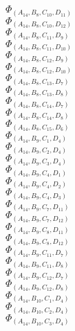 \documentclass[14pt]{article}
\begin{document}
    $\Phi_{({A}_{14}, {B}_{8}, {C}_{10}, {D}_{11})}$ \\ 
    $\Phi_{({A}_{14}, {B}_{8}, {C}_{10}, {D}_{12})}$ \\ 
    $\Phi_{({A}_{14}, {B}_{8}, {C}_{11}, {D}_{9})}$ \\ 
    $\Phi_{({A}_{14}, {B}_{8}, {C}_{11}, {D}_{10})}$ \\ 
    $\Phi_{({A}_{14}, {B}_{8}, {C}_{12}, {D}_{9})}$ \\ 
    $\Phi_{({A}_{14}, {B}_{8}, {C}_{12}, {D}_{10})}$ \\ 
    $\Phi_{({A}_{14}, {B}_{8}, {C}_{13}, {D}_{7})}$ \\ 
    $\Phi_{({A}_{14}, {B}_{8}, {C}_{13}, {D}_{8})}$ \\ 
    $\Phi_{({A}_{14}, {B}_{8}, {C}_{14}, {D}_{7})}$ \\ 
    $\Phi_{({A}_{14}, {B}_{8}, {C}_{14}, {D}_{8})}$ \\ 
    $\Phi_{({A}_{14}, {B}_{8}, {C}_{15}, {D}_{6})}$ \\ 
    $\Phi_{({A}_{14}, {B}_{9}, {C}_{1}, {D}_{4})}$ \\ 
    $\Phi_{({A}_{14}, {B}_{9}, {C}_{2}, {D}_{4})}$ \\ 
    $\Phi_{({A}_{14}, {B}_{9}, {C}_{3}, {D}_{4})}$ \\ 
    $\Phi_{({A}_{14}, {B}_{9}, {C}_{4}, {D}_{1})}$ \\ 
    $\Phi_{({A}_{14}, {B}_{9}, {C}_{4}, {D}_{2})}$ \\ 
    $\Phi_{({A}_{14}, {B}_{9}, {C}_{4}, {D}_{3})}$ \\ 
    $\Phi_{({A}_{14}, {B}_{9}, {C}_{7}, {D}_{11})}$ \\ 
    $\Phi_{({A}_{14}, {B}_{9}, {C}_{7}, {D}_{12})}$ \\ 
    $\Phi_{({A}_{14}, {B}_{9}, {C}_{8}, {D}_{11})}$ \\ 
    $\Phi_{({A}_{14}, {B}_{9}, {C}_{8}, {D}_{12})}$ \\ 
    $\Phi_{({A}_{14}, {B}_{9}, {C}_{11}, {D}_{7})}$ \\ 
    $\Phi_{({A}_{14}, {B}_{9}, {C}_{11}, {D}_{8})}$ \\ 
    $\Phi_{({A}_{14}, {B}_{9}, {C}_{12}, {D}_{7})}$ \\ 
    $\Phi_{({A}_{14}, {B}_{9}, {C}_{12}, {D}_{8})}$ \\ 
    $\Phi_{({A}_{14}, {B}_{10}, {C}_{1}, {D}_{4})}$ \\ 
    $\Phi_{({A}_{14}, {B}_{10}, {C}_{2}, {D}_{4})}$ \\ 
    $\Phi_{({A}_{14}, {B}_{10}, {C}_{3}, {D}_{4})}$ \\ 
\end{document}
